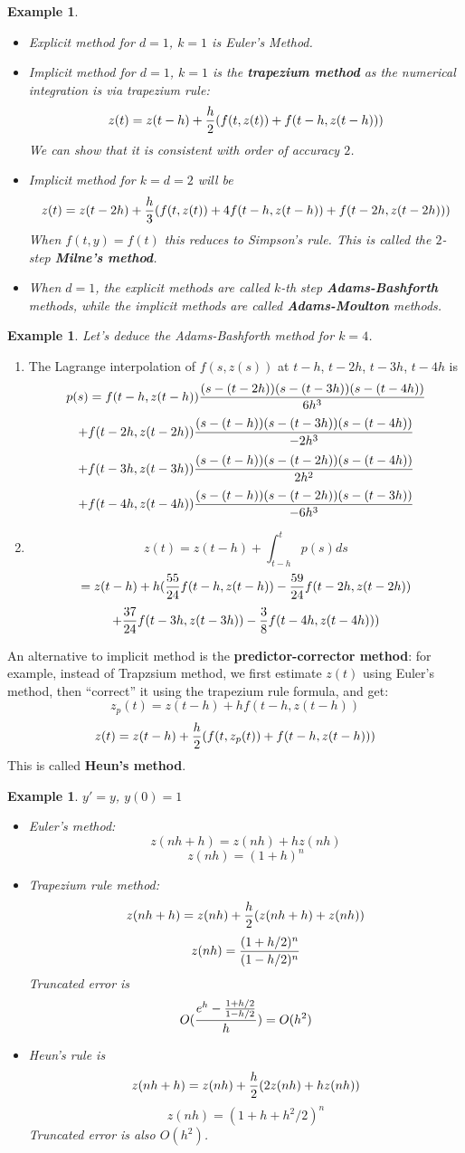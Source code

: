 \documentclass{article} %
\theoremstyle{break}
\newtheorem{exa}[definition]{Example}
\begin{document}
\begin{exa}\begin{itemize}
  \item Explicit method for $d=1$, $k=1$ is Euler's Method.
  \item Implicit method for $d=1$, $k=1$ is the {\bf trapezium method} as the numerical integration is via trapezium rule:
\[z(t)=z(t-h)+{h\over 2}(f(t, z(t))+f(t-h, z(t-h)))\] 
We can show that it is consistent with order of accuracy $2$.
\item Implicit method for $k=d=2$ will be
  \[z(t)=z(t-2h)+{h\over 3}(f(t, z(t))+4f(t-h, z(t-h))+f(t-2h, z(t-2h)))\]
  When $f(t, y)=f(t)$ this reduces to Simpson's rule. This is called the $2$-step {\bf Milne's method}.
\item When $d=1$, the explicit methods are called $k$-th step {\bf Adams-Bashforth} methods, while the implicit methods are called {\bf Adams-Moulton} methods. 
\end{itemize}
\end{exa}


\begin{exa}Let's deduce the Adams-Bashforth method for $k=4$.\end{exa}

\begin{enumerate}
\item The Lagrange interpolation of $f(s, z(s))$ at $t-h$, $t-2h$, $t-3h$, $t-4h$ is
  \[p(s)=f(t-h, z(t-h)){(s-(t-2h))(s-(t-3h))(s-(t-4h))\over 6h^3}\]
  \[+f(t-2h, z(t-2h)){(s-(t-h))(s-(t-3h))(s-(t-4h))\over -2h^3}\]
  \[+f(t-3h, z(t-3h)){(s-(t-h))(s-(t-2h))(s-(t-4h))\over 2h^2}\]
  \[+f(t-4h, z(t-4h)){(s-(t-h))(s-(t-2h))(s-(t-3h))\over -6h^3}\]
\item
  \[z(t)=z(t-h)+\int_{t-h}^tp(s)ds\]
  \[=z(t-h)+h({55\over 24}f(t-h, z(t-h))-{59\over 24}f(t-2h, z(t-2h))\]
  \[+{37\over 24}f(t-3h, z(t-3h))-{3\over 8}f(t-4h, z(t-4h)))\]
\end{enumerate}



An alternative to implicit method is the {\bf predictor-corrector method}: for example, instead of Trapzsium method, we first estimate $z(t)$ using Euler's method, then ``correct'' it using the trapezium rule formula, and get:
\[z_{p}(t)=z(t-h)+hf(t-h, z(t-h))\]
\[z(t)=z(t-h)+{h\over 2}(f(t, z_p(t))+f(t-h, z(t-h)))\] 
This is called {\bf Heun's method}.


\begin{exa}
  $y'=y$, $y(0)=1$
  \begin{itemize}
  \item Euler's method:
    \[z(nh+h)=z(nh)+hz(nh)\]
    \[z(nh)=(1+h)^n\]
  \item Trapezium rule method:
    \[z(nh+h)=z(nh)+{h\over 2}(z(nh+h)+z(nh))\]
    \[z(nh)={(1+h/2)^n\over (1-h/2)^n}\]
    Truncated error is
    \[O({e^h-{1+h/2\over 1-h/2}\over h})=O(h^2)\]
  \item Heun's rule is
    \[z(nh+h)=z(nh)+{h\over 2}(2z(nh)+hz(nh))\]
    \[z(nh)=(1+h+h^2/2)^n\]
    Truncated error is also $O(h^2)$.
  \end{itemize}
\end{exa}
\end{document}

